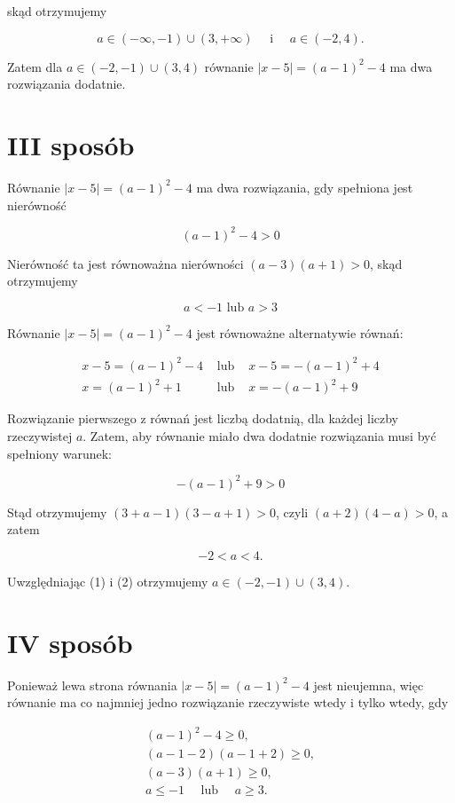 \documentclass[10pt]{article}
\begin{document}
skąd otrzymujemy

$$
a \in(-\infty,-1) \cup(3,+\infty) \quad \text { i } \quad a \in(-2,4) .
$$

Zatem dla $a \in(-2,-1) \cup(3,4)$ równanie $|x-5|=(a-1)^{2}-4$ ma dwa rozwiązania dodatnie.

\section*{III sposób}
Równanie $|x-5|=(a-1)^{2}-4$ ma dwa rozwiązania, gdy spełniona jest nierówność

$$
(a-1)^{2}-4>0
$$

Nierówność ta jest równoważna nierówności $(a-3)(a+1)>0$, skąd otrzymujemy


\begin{equation*}
a<-1 \text { lub } a>3 \tag{1}
\end{equation*}


Równanie $|x-5|=(a-1)^{2}-4$ jest równoważne alternatywie równań:

$$
\begin{array}{lll}
x-5=(a-1)^{2}-4 & \text { lub } & x-5=-(a-1)^{2}+4 \\
x=(a-1)^{2}+1 & \text { lub } & x=-(a-1)^{2}+9
\end{array}
$$

Rozwiązanie pierwszego z równań jest liczbą dodatnią, dla każdej liczby rzeczywistej $a$. Zatem, aby równanie miało dwa dodatnie rozwiązania musi być spełniony warunek:

$$
-(a-1)^{2}+9>0
$$

Stąd otrzymujemy $(3+a-1)(3-a+1)>0$, czyli $(a+2)(4-a)>0$, a zatem


\begin{equation*}
-2<a<4 . \tag{2}
\end{equation*}


Uwzględniając (1) i (2) otrzymujemy $a \in(-2,-1) \cup(3,4)$.

\section*{IV sposób}
Ponieważ lewa strona równania $|x-5|=(a-1)^{2}-4$ jest nieujemna, więc równanie ma co najmniej jedno rozwiązanie rzeczywiste wtedy i tylko wtedy, gdy

$$
\begin{gathered}
(a-1)^{2}-4 \geq 0, \\
(a-1-2)(a-1+2) \geq 0, \\
(a-3)(a+1) \geq 0, \\
a \leq-1 \quad \text { lub } \quad a \geq 3 .
\end{gathered}
$$
\end{document}
